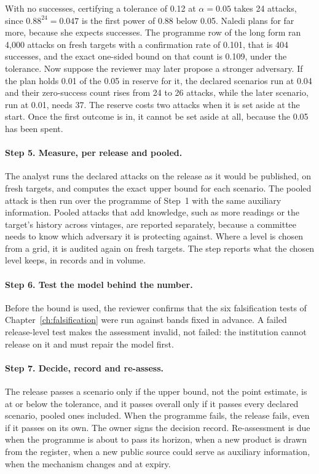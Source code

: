 \begin{example}\label{c16:ex-size}
With no successes, certifying a tolerance of 0.12 at $\alpha = 0.05$ takes 24 attacks,
since $0.88^{24} = 0.047$ is the first power of 0.88 below 0.05. Naledi plans for far
more, because she expects successes. The programme row of the long form ran 4,000 attacks
on fresh targets with a confirmation rate of 0.101, that is 404 successes, and the exact
one-sided bound on that count is 0.109, under the tolerance. Now suppose the reviewer may
later propose a stronger adversary. If the plan holds 0.01 of the 0.05 in reserve for it,
the declared scenarios run at 0.04 and their zero-success count rises from 24 to 26
attacks, while the later scenario, run at 0.01, needs 37. The reserve costs two attacks
when it is set aside at the start. Once the first outcome is in, it cannot be set aside at
all, because the 0.05 has been spent.
\end{example}

\paragraph{Step 5. Measure, per release and pooled.} The analyst runs the declared
attacks on the release as it would be published, on fresh targets, and computes the
exact upper bound for each scenario. The pooled attack is then run over the
programme of Step~1 with the same auxiliary information. Pooled attacks that add
knowledge, such as more readings or the target's history across vintages, are
reported separately, because a committee needs to know which adversary it is
protecting against. Where a level is chosen from a grid, it is audited again on fresh
targets. The step reports what the chosen level keeps, in records and in volume.

\paragraph{Step 6. Test the model behind the number.} Before the bound is used, the
reviewer confirms that the six falsification tests of
Chapter~\ref{ch:falsification} were run against bands fixed in advance. A failed
release-level test makes the assessment invalid, not failed: the institution cannot
release on it and must repair the model first.

\paragraph{Step 7. Decide, record and re-assess.} The release passes a scenario only
if the upper bound, not the point estimate, is at or below the tolerance, and it
passes overall only if it passes every declared scenario, pooled ones included. When
the programme fails, the release fails, even if it passes on its own. The owner signs
the decision record. Re-assessment is due when the programme is about to pass its
horizon, when a new product is drawn from the register, when a new public source
could serve as auxiliary information, when the mechanism changes and at expiry.

